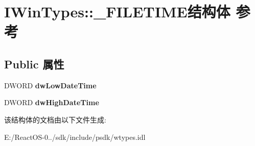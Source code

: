 \hypertarget{struct_i_win_types_1_1___f_i_l_e_t_i_m_e}{}\section{I\+Win\+Types\+:\+:\+\_\+\+F\+I\+L\+E\+T\+I\+M\+E结构体 参考}
\label{struct_i_win_types_1_1___f_i_l_e_t_i_m_e}
\subsection*{Public 属性}
\begin{DoxyCompactItemize}
\item 
\mbox{\label{struct_i_win_types_1_1___f_i_l_e_t_i_m_e_a1099d53dbadcdf5b6332eb95c6d873f0}} 
D\+W\+O\+RD {\bfseries dw\+Low\+Date\+Time}
\item 
\mbox{\label{struct_i_win_types_1_1___f_i_l_e_t_i_m_e_a534761cf21d8f9448e3c1c4f5419b2e2}} 
D\+W\+O\+RD {\bfseries dw\+High\+Date\+Time}
\end{DoxyCompactItemize}


该结构体的文档由以下文件生成\+:\begin{DoxyCompactItemize}
\item 
E\+:/\+React\+O\+S-\/0../sdk/include/psdk/wtypes.\+idl\end{DoxyCompactItemize}

